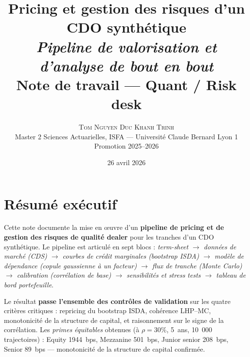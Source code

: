 \documentclass[11pt,a4paper]{article}
\title{
  \vspace{-1.2cm}
  {\color{cprimary}\Large Pricing et gestion des risques d'un CDO synthétique}\\[2pt]
  {\Large \textit{Pipeline de valorisation et d'analyse de bout en bout}}\\[6pt]
  {\normalsize Note de travail — Quant / Risk desk}
}
\author{
  \textsc{Tom Nguyen Duc Khanh Trinh}\\
  \small Master 2 Sciences Actuarielles, ISFA --- Université Claude Bernard Lyon 1\\
  \small Promotion 2025--2026
}
\date{26 avril 2026}
\begin{document}
\maketitle
\thispagestyle{empty}

\vspace{-0.3cm}
\begin{center}
\end{center}

\section*{Résumé exécutif}

Cette note documente la mise en \oe uvre d'un \textbf{pipeline de pricing et de gestion
des risques de qualité dealer} pour les tranches d'un CDO synthétique. Le pipeline est
articulé en sept blocs : \emph{term-sheet $\to$ données de marché (CDS) $\to$ courbes de
crédit marginales (bootstrap ISDA) $\to$ modèle de dépendance (copule gaussienne à un
facteur) $\to$ flux de tranche (Monte Carlo) $\to$ calibration (corrélation de base)
$\to$ sensibilités et stress tests $\to$ tableau de bord portefeuille}.

Le résultat \textbf{passe l'ensemble des contrôles de validation} sur les quatre
critères critiques : repricing du bootstrap ISDA, cohérence LHP--MC, monotonicité de la
structure de capital, et raisonnement sur le signe de la corrélation. Les
\emph{primes équitables} obtenues (à $\rho = 30\%$, 5~ans, 10~000 trajectoires) :
Equity \SI{1944}{bps}, Mezzanine \SI{501}{bps}, Junior senior \SI{208}{bps}, Senior
\SI{89}{bps} --- monotonicité de la structure de capital confirmée.

\tableofcontents
\newpage

\end{document}
